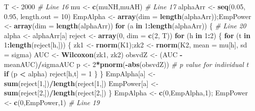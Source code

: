 \documentclass[
]{book}
\newenvironment{Shaded}{\begin{snugshade}}{\end{snugshade}}
\newcommand{\CommentTok}[1]{\textcolor[rgb]{0.56,0.35,0.01}{\textit{#1}}}
\newcommand{\ControlFlowTok}[1]{\textcolor[rgb]{0.13,0.29,0.53}{\textbf{#1}}}
\newcommand{\DataTypeTok}[1]{\textcolor[rgb]{0.13,0.29,0.53}{#1}}
\newcommand{\DecValTok}[1]{\textcolor[rgb]{0.00,0.00,0.81}{#1}}
\newcommand{\FloatTok}[1]{\textcolor[rgb]{0.00,0.00,0.81}{#1}}
\newcommand{\KeywordTok}[1]{\textcolor[rgb]{0.13,0.29,0.53}{\textbf{#1}}}
\newcommand{\NormalTok}[1]{#1}
\newcommand{\OperatorTok}[1]{\textcolor[rgb]{0.81,0.36,0.00}{\textbf{#1}}}
\newcommand{\StringTok}[1]{\textcolor[rgb]{0.31,0.60,0.02}{#1}}
\begin{document}
\begin{Shaded}
\begin{Highlighting}[]
\NormalTok{T \textless{}{-}}\StringTok{ }\DecValTok{2000}  \CommentTok{\# Line 16}
\NormalTok{mu \textless{}{-}}\StringTok{ }\KeywordTok{c}\NormalTok{(muNH,muAH) }\CommentTok{\# Line 17}
\NormalTok{alphaArr \textless{}{-}}\StringTok{ }\KeywordTok{seq}\NormalTok{(}\FloatTok{0.05}\NormalTok{, }\FloatTok{0.95}\NormalTok{, }\DataTypeTok{length.out =} \DecValTok{10}\NormalTok{)}
\NormalTok{EmpAlpha \textless{}{-}}\StringTok{ }\KeywordTok{array}\NormalTok{(}\DataTypeTok{dim =} \KeywordTok{length}\NormalTok{(alphaArr));EmpPower \textless{}{-}}\StringTok{ }\KeywordTok{array}\NormalTok{(}\DataTypeTok{dim =} \KeywordTok{length}\NormalTok{(alphaArr))}
\ControlFlowTok{for}\NormalTok{ (a }\ControlFlowTok{in} \DecValTok{1}\OperatorTok{:}\KeywordTok{length}\NormalTok{(alphaArr)) \{ }\CommentTok{\# Line 20}
\NormalTok{  alpha \textless{}{-}}\StringTok{ }\NormalTok{alphaArr[a] }
\NormalTok{  reject \textless{}{-}}\StringTok{ }\KeywordTok{array}\NormalTok{(}\DecValTok{0}\NormalTok{, }\DataTypeTok{dim =} \KeywordTok{c}\NormalTok{(}\DecValTok{2}\NormalTok{, T))}
  \ControlFlowTok{for}\NormalTok{ (h }\ControlFlowTok{in} \DecValTok{1}\OperatorTok{:}\DecValTok{2}\NormalTok{) \{  }
    \ControlFlowTok{for}\NormalTok{ (t }\ControlFlowTok{in} \DecValTok{1}\OperatorTok{:}\KeywordTok{length}\NormalTok{(reject[h,])) \{  }
\NormalTok{      zk1 \textless{}{-}}\StringTok{ }\KeywordTok{rnorm}\NormalTok{(K1);zk2 \textless{}{-}}\StringTok{ }\KeywordTok{rnorm}\NormalTok{(K2, }\DataTypeTok{mean =}\NormalTok{ mu[h], }\DataTypeTok{sd =}\NormalTok{ sigma)  }
\NormalTok{      AUC \textless{}{-}}\StringTok{ }\KeywordTok{Wilcoxon}\NormalTok{(zk1, zk2)  }
\NormalTok{      obsvdZ \textless{}{-}}\StringTok{ }\NormalTok{(AUC }\OperatorTok{{-}}\StringTok{ }\NormalTok{meanAUC)}\OperatorTok{/}\NormalTok{sigmaAUC}
\NormalTok{      p \textless{}{-}}\StringTok{ }\DecValTok{2}\OperatorTok{*}\KeywordTok{pnorm}\NormalTok{(}\OperatorTok{{-}}\KeywordTok{abs}\NormalTok{(obsvdZ)) }\CommentTok{\# p value for individual t}
      \ControlFlowTok{if}\NormalTok{ (p }\OperatorTok{\textless{}}\StringTok{ }\NormalTok{alpha) reject[h,t] =}\StringTok{ }\DecValTok{1} 
\NormalTok{    \}}
\NormalTok{  \}}
\NormalTok{  EmpAlpha[a] \textless{}{-}}\StringTok{ }\KeywordTok{sum}\NormalTok{(reject[}\DecValTok{1}\NormalTok{,])}\OperatorTok{/}\KeywordTok{length}\NormalTok{(reject[}\DecValTok{1}\NormalTok{,])}
\NormalTok{  EmpPower[a] \textless{}{-}}\StringTok{ }\KeywordTok{sum}\NormalTok{(reject[}\DecValTok{2}\NormalTok{,])}\OperatorTok{/}\KeywordTok{length}\NormalTok{(reject[}\DecValTok{2}\NormalTok{,])}
\NormalTok{\}}
\NormalTok{EmpAlpha \textless{}{-}}\StringTok{ }\KeywordTok{c}\NormalTok{(}\DecValTok{0}\NormalTok{,EmpAlpha,}\DecValTok{1}\NormalTok{); EmpPower \textless{}{-}}\StringTok{ }\KeywordTok{c}\NormalTok{(}\DecValTok{0}\NormalTok{,EmpPower,}\DecValTok{1}\NormalTok{) }\CommentTok{\# Line 19}


\end{Highlighting}
\end{Shaded}
\end{document}
